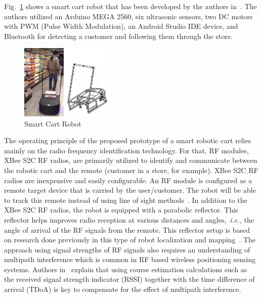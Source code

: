 \documentclass[conference]{IEEEtran}
\begin{document}
%
Fig.~\ref{fig:SmartCart} shows a smart cart robot that has been developed by the authors in~\cite{Rawashdeh2017-Person}. The authors utilized an Arduino MEGA 2560, six
ultrasonic sensors, two DC motors with PWM (Pulse Width Modulation), an Android
Studio IDE device, and Bluetooth for detecting a customer and following them
through the store. %
%
\begin{figure}[htpb]
   \centering
   \includegraphics[width=0.40\textwidth]{figs/img/SmartCart}
   \caption{Smart Cart Robot}
   \label{fig:SmartCart}
\end{figure}
%
The operating principle of the proposed prototype of a smart robotic cart relies mainly on the radio frequency identification technology. For that, RF modules, XBee S2C RF radios, are primarily utilized to identify and communicate between the robotic cart and the remote (customer in a store, for example). XBee S2C RF radios are inexpensive and easily configurable. An RF module is configured as a remote target device that is carried
by the user/customer. The robot will be able to track this remote instead of using line
of sight methods~\cite{Miah2018-Intelligent}. In addition to the XBee S2C RF
radios, the robot is equipped with a parabolic reflector. This reflector helps improves radio reception at various distances and angles,~\textit{i.e.,} the angle of arrival of
the RF signals from the remote. This reflector setup is based on research done previously in this type of robot localization and mapping~\cite{Miah2018-Intelligent,Li2013ANA}. The approach using signal strengths of RF signals also requires an understanding
of multipath interference which is common in RF based wireless positioning
sensing systems. Authors in~\cite{xie_jiang_zhao_zhang_2019} explain that using
course estimation calculations such as the received signal strength indicator (RSSI) together with the time difference of arrival (TDoA) is key to compensate for the effect of multipath interference. 
\end{document}
